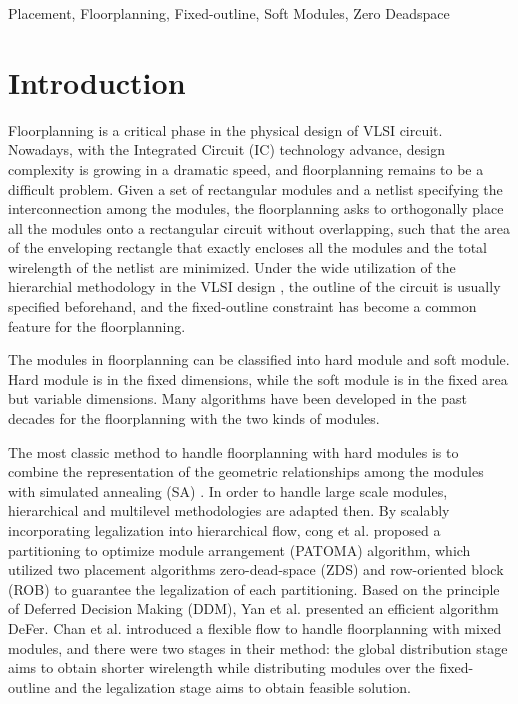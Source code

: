 \documentclass[conference]{IEEEtran}
\begin{document}
\begin{IEEEkeywords}
Placement, Floorplanning, Fixed-outline, Soft Modules, Zero Deadspace



\end{IEEEkeywords}



\IEEEpeerreviewmaketitle



\section{Introduction}

Floorplanning is a critical phase in the physical design of VLSI circuit. Nowadays, with the Integrated Circuit (IC) technology advance, design complexity is growing in a dramatic speed, and floorplanning remains to be a difficult problem. Given a set of rectangular modules and a netlist specifying the interconnection among the modules, the floorplanning asks to orthogonally place all the modules onto a rectangular circuit without overlapping, such that the area of the enveloping rectangle that exactly encloses all the modules and the total wirelength of the netlist are minimized. Under the wide utilization of the hierarchial methodology in the VLSI design \cite{classicalharmful}, the outline of the circuit is usually specified beforehand, and the fixed-outline constraint has become a common feature for the floorplanning.

The modules in floorplanning can be classified into hard module and soft module. Hard module is in the fixed dimensions, while the soft module is in the fixed area but variable dimensions. Many algorithms have been developed in the past decades for the floorplanning with the two kinds of modules.

The most classic method to handle floorplanning with hard modules is to combine the representation of the geometric relationships \cite{slicingtree,sp,o-tree,b-tree} among the modules with simulated annealing (SA) \cite{SA1,SA2}. In order to handle large scale modules, hierarchical and multilevel methodologies are adapted then. By scalably incorporating legalization into hierarchical flow, cong et al. \cite{PATOMA} proposed a partitioning to optimize module arrangement (PATOMA) algorithm, which utilized two placement algorithms zero-dead-space (ZDS) and row-oriented block (ROB) to guarantee the legalization of each partitioning. Based on the principle of Deferred Decision Making (DDM), Yan et al. \cite{DeFer} presented an efficient algorithm DeFer. Chan et al. \cite{newbest} introduced a flexible flow to handle floorplanning with mixed modules, and there were two stages in their method: the global distribution stage aims to obtain shorter wirelength while distributing modules over the fixed-outline and the legalization stage aims to obtain feasible solution.
\end{document}
